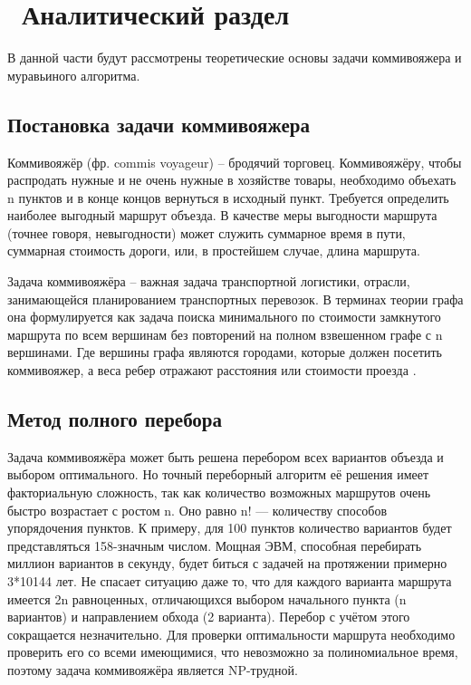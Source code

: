 \chapter{ Аналитический раздел}
\label{cha:analytical}
    В данной части будут рассмотрены теоретические 
    основы задачи коммивояжера и муравьиного алгоритма. 
	
    \section{Постановка задачи коммивояжера} 
        Коммивояжёр (фр. commis voyageur) -- бродячий торговец.
        Коммивояжёру, чтобы распродать нужные и не очень нужные в хозяйстве товары,
        необходимо объехать n пунктов и в конце концов вернуться в исходный пункт.
        Требуется определить наиболее выгодный маршрут объезда. 
        В качестве меры выгодности маршрута (точнее говоря, невыгодности)
        может служить суммарное время в пути, суммарная стоимость дороги,
        или, в простейшем случае, длина маршрута.
        
        Задача коммивояжёра -- важная задача транспортной логистики,
        отрасли, занимающейся планированием транспортных перевозок.
        В терминах теории графа она формулируется как задача
        поиска минимального по стоимости замкнутого маршрута
        по всем вершинам без повторений на полном взвешенном 
        графе с n вершинами. 
        Где вершины графа являются городами, которые должен
        посетить коммивояжер, а веса ребер отражают расстояния
        или стоимости проезда \cite{rec-alg}. 
        
    \section{Метод полного перебора}
        Задача коммивояжёра может быть решена перебором всех вариантов объезда и выбором оптимального.
        Но точный переборный алгоритм её решения имеет факториальную сложность, так как
        количество возможных маршрутов очень быстро возрастает с ростом n. 
        Оно равно n! — количеству способов упорядочения пунктов. 
        К примеру, для 100 пунктов количество вариантов будет представляться 158-значным числом.
        Мощная ЭВМ, способная перебирать миллион вариантов в секунду, 
        будет биться с задачей на протяжении примерно 3*10144 лет.
        Не спасает ситуацию даже то, что для каждого варианта маршрута имеется 2n равноценных,
        отличающихся выбором начального пункта (n вариантов) и направлением обхода (2 варианта).
        Перебор с учётом этого сокращается незначительно. 
        Для проверки оптимальности маршрута необходимо проверить 
        его со всеми имеющимися, что невозможно за полиномиальное время,
        поэтому задача коммивояжёра является NP-трудной.

